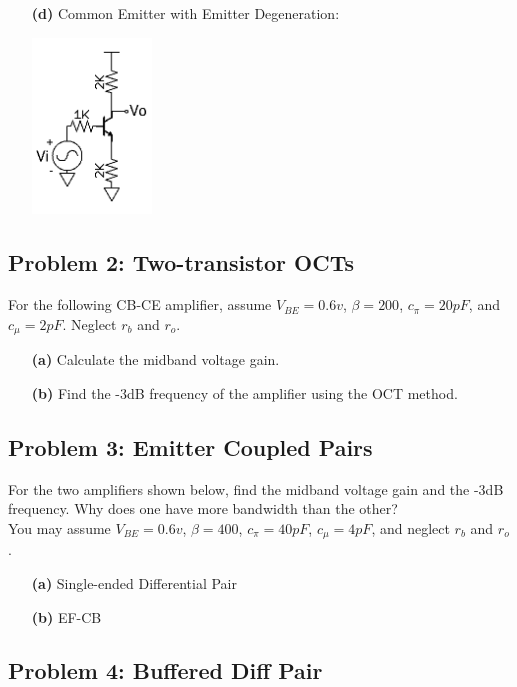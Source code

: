 \documentclass[11pt,twoside]{article}
\begin{document}
\begin{enumerate}
\begin{center}
\end{center}
	\item[\bf(d)] Common Emitter with Emitter Degeneration:
\begin{center}
\includegraphics[width=0.25\textwidth]{ceed.png}
\end{center}
\end{enumerate}

\subsection*{Problem 2: Two-transistor OCTs}
For the following CB-CE amplifier, assume $V_{BE}=0.6v$, $\beta=200$, $c_\pi=20pF$, and $c_\mu=2pF$.
Neglect $r_b$ and $r_o$.

\begin{enumerate}
	\item[\bf(a)] Calculate the midband voltage gain.
	\item[\bf(b)] Find the -3dB frequency of the amplifier using the OCT method.
\end{enumerate}

\subsection*{Problem 3: Emitter Coupled Pairs}
For the two amplifiers shown below, find the midband voltage gain and the -3dB frequency.
Why does one have more bandwidth than the other? \\
You may assume $V_{BE}=0.6v$, $\beta=400$, $c_\pi=40pF$, $c_\mu=4pF$, and neglect $r_b$ and $r_o$.

\begin{enumerate}
	\item[\bf(a)] Single-ended Differential Pair
	\item[\bf(b)] EF-CB
\end{enumerate}

\subsection*{Problem 4: Buffered Diff Pair}


\clearpage
\end{document}
